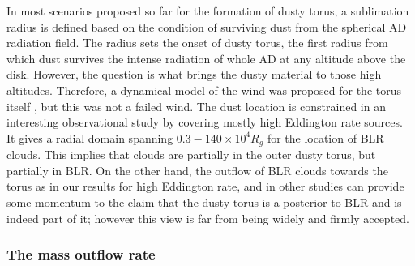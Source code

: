 \documentclass[twocolumn]{aastex62}
\begin{document}
In most scenarios proposed so far for the formation of dusty torus, a sublimation radius is defined based on the condition of surviving dust from the spherical AD radiation field. The radius sets the onset of dusty torus, the first radius from which dust survives the intense radiation of whole AD at any altitude above the disk. However, the question is what brings the dusty material to those high altitudes. Therefore, a dynamical model of the wind was proposed for the torus itself \citep[e.g.][]{Konigl1994,Elitzur2006,gallagher2015}, but this was not a failed wind.
The dust location is constrained in an interesting observational study by \citet{markowitz2014} covering mostly high Eddington rate sources. It gives a radial domain spanning $0.3 - 140 \times 10^4 R_{g}$ for the location of BLR clouds. This implies that clouds are partially in the outer dusty torus, but partially in BLR. On the other hand, the outflow of BLR clouds towards the torus as in our results for high Eddington rate, and in other studies \citep[e.g.][]{Kawaguchi2010, Kawaguchi2011, Goad2012, honig2019, Figaredo2020} can provide some momentum to the claim that the dusty torus is a posterior to BLR and is indeed part of it; however this view is far from being widely and firmly accepted.

\subsubsection{The mass outflow rate}
\end{document}
